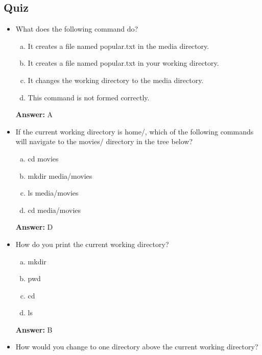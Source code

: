 \documentclass[12pt]{article}
\begin{document}
\subsection{Quiz}
\begin{itemize}
    \item What does the following command do?
    \begin{enumerate}[a)]
        \item It creates a file named popular.txt in the media directory.
        \item It creates a file named popular.txt in your working directory.
        \item It changes the working directory to the media directory.
        \item This command is not formed correctly.
    \end{enumerate}

    \bigskip

    \textbf{Answer:} A

    \item If the current working directory is home/, which of the following commands
    will navigate to the movies/ directory in the tree below?

    \begin{enumerate}[a)]
        \item cd movies
        \item mkdir media/movies
        \item ls media/movies
        \item cd media/movies
    \end{enumerate}

    \bigskip

    \textbf{Answer:} D

    \item How do you print the current working directory?

    \begin{enumerate}[a)]
        \item mkdir
        \item pwd
        \item cd
        \item ls
    \end{enumerate}

    \bigskip

    \textbf{Answer:} B

    \item How would you change to one directory above the current working directory?


\end{itemize}
\end{document}
